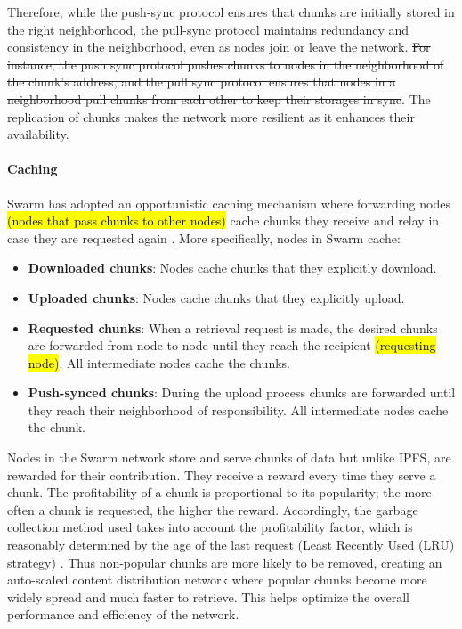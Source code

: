 Therefore, while the push-sync protocol ensures that chunks are initially stored in the right neighborhood, the pull-sync protocol maintains redundancy and consistency in the neighborhood, even as nodes join or leave the network. \sout{For instance, the push sync protocol pushes chunks to nodes in the neighborhood of the chunk's address, and the pull sync protocol ensures that nodes in a neighborhood pull chunks from each other to keep their storages in sync}. The replication of chunks makes the network more resilient as it enhances their availability.

\paragraph{Caching}\label{par:caching_swarm}
Swarm has adopted an opportunistic caching mechanism where forwarding nodes \hl{(nodes that pass chunks to other nodes)} cache chunks they receive and relay in case they are requested again \citep[p.~47]{tron_2020}. More specifically, nodes in Swarm cache:

\begin{itemize}
    \item \textbf{Downloaded chunks}: Nodes cache chunks that they explicitly download.
    \item \textbf{Uploaded chunks}: Nodes cache chunks that they explicitly upload.
    \item \textbf{Requested chunks}: When a retrieval request is made, the desired chunks are forwarded from node to node until they reach the recipient \hl{(requesting node)}. All intermediate nodes cache the chunks.
    \item \textbf{Push-synced chunks}: During the upload process chunks are forwarded until they reach their neighborhood of responsibility. All intermediate nodes cache the chunk.
\end{itemize} 

Nodes in the Swarm network store and serve chunks of data but unlike IPFS, are rewarded for their contribution. They receive a reward every time they serve a chunk. The profitability of a chunk is proportional to its popularity; the more often a chunk is requested, the higher the reward. Accordingly, the garbage collection method used takes into account the profitability factor, which is reasonably determined by the age of the last request (Least Recently Used (LRU) strategy) \citep[p.~72]{tron_2020}. Thus non-popular chunks are more likely to be removed, creating an auto-scaled content distribution network \citep[p.~72]{tron_2020} where popular chunks become more widely spread and much faster to retrieve. This helps optimize the overall performance and efficiency of the network.

